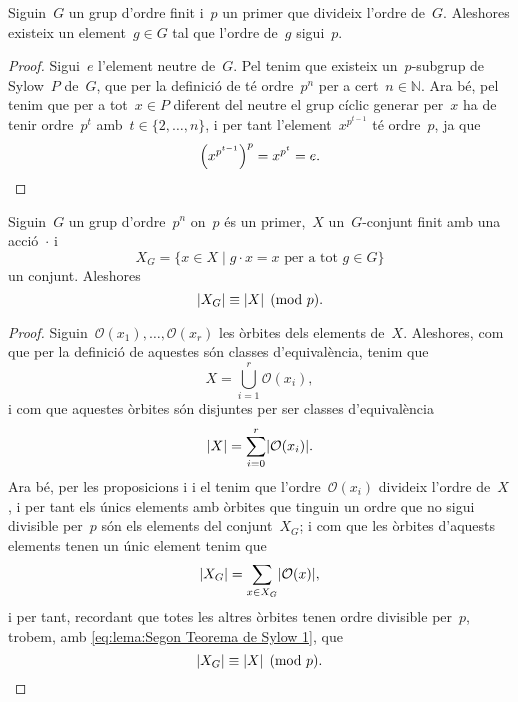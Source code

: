 \documentclass[../../main.tex]{subfiles}
\begin{document}
    \begin{corollary}
        \label{thm:Teorema de Cauchy per grups}
        Siguin~\(G\) un grup d'ordre finit i~\(p\) un primer que divideix l'ordre de~\(G\).
        Aleshores existeix un element~\(g\in G\) tal que l'ordre de~\(g\) sigui~\(p\).
        \begin{proof}
            Sigui~\(e\) l'element neutre de~\(G\).
            Pel  tenim que existeix un~\(p\)-subgrup de Sylow~\(P\) de~\(G\), que per la definició de  té ordre~\(p^{n}\) per a cert~\(n\in\mathbb{N}\).
            Ara bé, pel  tenim que per a tot~\(x\in P\) diferent del neutre el grup cíclic generar per~\(x\) ha de tenir ordre~\(p^{t}\) amb~\(t\in\{2,\dots,n\}\), i per tant l'element~\(x^{p^{t-1}}\) té ordre~\(p\), ja que
            \[
                \left(x^{p^{t-1}}\right)^{p}=x^{p^{t}}=e.\qedhere
            \]
        \end{proof}
    \end{corollary}
    \begin{lemma}
        \label{lema:Segon Teorema de Sylow}
        Siguin~\(G\) un grup d'ordre~\(p^{n}\) on~\(p\) és un primer,~\(X\) un~\(G\)-conjunt finit amb una acció~\(\cdot\) i
        \[
            X_{G}=\{x\in X\mid g\cdot x=x\text{ per a tot }g\in G\}
        \]
        un conjunt.
        Aleshores
        \[
            \abs{X_{G}}\equiv\abs{X}\pmod{p}.
        \]
        \begin{proof}
            Siguin~\(\mathcal{O}(x_{1}),\dots,\mathcal{O}(x_{r})\) les òrbites dels elements de~\(X\).
            Aleshores, com que per la definició de  aquestes són classes d'equivalència, tenim que %
            \[
                X=\bigcup_{i=1}^{r}\mathcal{O}(x_{i}),
            \]
            i com que aquestes òrbites són disjuntes per ser classes d'equivalència
            \begin{equation}
        \label{eq:lema:Segon Teorema de Sylow 1}
            \abs{X}=\sum_{i=0}^{r}\abs{\mathcal{O}(x_{i})}.
            \end{equation}
            Ara bé, per les proposicions  i  i el  tenim que l'ordre~\(\mathcal{O}(x_{i})\) divideix l'ordre de~\(X\), i per tant els únics elements amb òrbites que tinguin un ordre que no sigui divisible per~\(p\) són els elements del conjunt~\(X_{G}\); i com que les òrbites d'aquests elements tenen un únic element tenim que
            \[
                \abs{X_{G}}=\sum_{x\in X_{G}}\abs{\mathcal{O}(x)},
            \]
            i per tant, recordant que totes les altres òrbites tenen ordre divisible per~\(p\), trobem, amb \eqref{eq:lema:Segon Teorema de Sylow 1}, que
            \[
                \abs{X_{G}}\equiv\abs{X}\pmod{p}.\qedhere
            \]
        \end{proof}
    \end{lemma}
\end{document}
